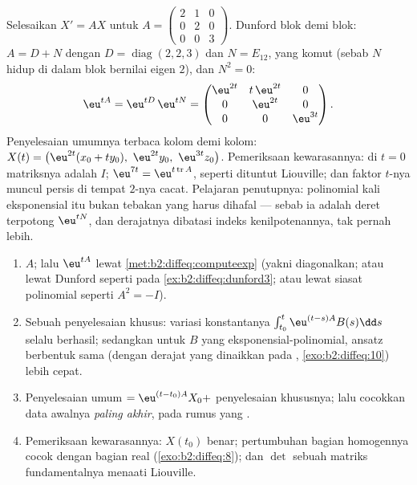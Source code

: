 \begin{example}\label{ex:b2:diffeq:dunford3}
Selesaikan $X' = AX$ untuk $A = \begin{pmatrix} 2 & 1 & 0\\ 0 & 2 &
0\\ 0 & 0 & 3\end{pmatrix}$. Dunford blok demi blok: $A = D + N$
dengan $D = \operatorname{diag}(2, 2, 3)$ dan $N = E_{12}$, yang
komut (sebab $N$ hidup di dalam blok bernilai eigen $2$), dan $N^2 =
0$:
\[
\eu^{tA} = \eu^{tD}\,\eu^{tN}
= \begin{pmatrix}
\eu^{2t} & t\,\eu^{2t} & 0\\
0 & \eu^{2t} & 0\\
0 & 0 & \eu^{3t}
\end{pmatrix} .
\]
Penyelesaian umumnya terbaca kolom demi kolom: $X(t) =
\bigl(\eu^{2t}(x_0 + ty_0),\ \eu^{2t}y_0,\
\eu^{3t}z_0\bigr)$. Pemeriksaan kewarasannya: di $t = 0$ matriksnya adalah
$I$; \omterm{def:b2:linalg:det}{determinannya} $\eu^{7t} =
\eu^{t\operatorname{tr}A}$, seperti dituntut Liouville; dan
faktor $t$-nya muncul persis di tempat  $2$-nya
cacat. Pelajaran penutupnya: polinomial kali eksponensial itu
bukan tebakan yang harus dihafal --- sebab ia adalah deret terpotong
$\eu^{tN}$, dan derajatnya dibatasi indeks kenilpotenannya,
tak pernah lebih.
\end{example}

\begin{method}[Menyelesaikan $X' = AX + B(t)$, dari awal sampai akhir]\label{met:b2:diffeq:solvelinear}
\begin{enumerate}
  \item {} $A$; lalu $\eu^{tA}$ lewat
        \cref{met:b2:diffeq:computeexp} (yakni diagonalkan; atau
        lewat Dunford seperti pada \cref{ex:b2:diffeq:dunford3}; atau lewat
        siasat polinomial seperti $A^2 = -I$).
  \item Sebuah penyelesaian khusus: variasi konstantanya
        $\int_{t_0}^t\eu^{(t-s)A}B(s)\dd s$ selalu berhasil;
        sedangkan untuk $B$ yang eksponensial-polinomial, ansatz berbentuk
        sama (dengan derajat yang dinaikkan pada ,
        \cref{exo:b2:diffeq:10}) lebih cepat.
  \item Penyelesaian umum $= \eu^{(t-t_0)A}X_0 +$ penyelesaian khususnya;
        lalu cocokkan data awalnya \emph{paling akhir}, pada
        rumus yang .
  \item Pemeriksaan kewarasannya: $X(t_0)$ benar; pertumbuhan bagian
        homogennya cocok dengan bagian real 
        (\cref{exo:b2:diffeq:8}); dan $\det$ sebuah matriks
        fundamentalnya menaati Liouville.
\end{enumerate}
\end{method}

